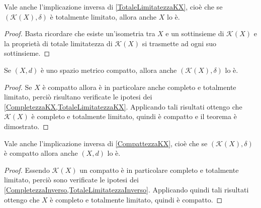 \begin{remark}\label{TotaleLimitatezzaInverso}
	Vale anche l'implicazione inversa di \cref{TotaleLimitatezzaKX}, cioè che se  $(\mathcal{K}(X),\delta)$ è totalmente limitato, allora anche $X$ lo è.
\end{remark}
\begin{proof}
	Basta ricordare che esiste un'isometria tra $X$ e un sottinsieme di $\mathcal{K}(X)$ e la proprietà di totale limitatezza di $\mathcal{K}(X)$ si trasmette ad ogni suo sottinsieme.
\end{proof}



\begin{theorem} \label{CompattezzaKX}
	Se $(X,d)$ è uno spazio metrico compatto, allora anche $(\mathcal{K}(X),\delta)$ lo è.
\end{theorem}
\begin{proof}
	Se $X$ è compatto allora è in particolare anche completo e totalmente limitato, perciò risultano verificate le ipotesi dei \cref{CompletezzaKX,TotaleLimitatezzaKX}. Applicando tali risultati ottengo che $\mathcal{K}(X)$ è completo e totalmente limitato, quindi è compatto e il teorema è dimostrato.
\end{proof}

\begin{remark} \label{CompattezzaInverso}
	Vale anche l'implicazione inversa di \cref{CompattezzaKX}, cioè che se  $(\mathcal{K}(X),\delta)$ è compatto allora anche $(X,d)$ lo è.
\end{remark}
\begin{proof}
	Essendo $\mathcal{K}(X)$ un compatto è in particolare completo e totalmente limitato, perciò sono verificate le ipotesi dei \cref{CompletezzaInverso,TotaleLimitatezzaInverso}. Applicando quindi tali risultati ottengo che $X$ è completo e totalmente limitato, quindi è compatto.
\end{proof}

